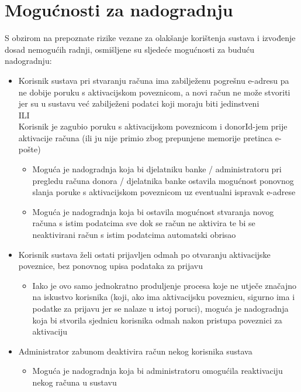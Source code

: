         \section{Mogućnosti za nadogradnju}
            \par{
            S obzirom na prepoznate rizike vezane za olakšanje korištenja sustava i izvođenje dosad nemogućih radnji, osmišljene su sljedeće mogućnosti za buduću nadogradnju:
            \begin{itemize}
            
                 \item Korisnik sustava pri stvaranju računa ima zabilježenu pogrešnu e-adresu pa ne dobije poruku s aktivacijskom poveznicom, a novi račun ne može stvoriti jer su u sustavu već zabilježeni podatci koji moraju biti jedinstveni 
                 \\ ILI
                \\ Korisnik je zagubio poruku s aktivacijskom poveznicom i donorId-jem prije aktivacije računa (ili ju nije primio zbog prepunjene memorije pretinca e-pošte)
                \begin{itemize}
                    \item Moguća je nadogradnja koja  bi djelatniku banke / administratoru pri pregledu računa donora / djelatnika banke ostavila mogućnost ponovnog slanja poruke s aktivacijskom poveznicom uz eventualni ispravak e-adrese
                    \item Moguća je nadogradnja koja bi ostavila mogućnost stvaranja novog računa s istim podatcima sve dok se račun ne aktivira te bi se neaktivirani račun s istim podatcima automatski obrisao
                \end{itemize}
                
                 \item Korisnik sustava želi ostati prijavljen odmah po otvaranju aktivacijske poveznice, bez ponovnog upisa podataka za prijavu
                \begin{itemize}
                    \item Iako je ovo samo jednokratno produljenje procesa koje ne utječe značajno na iskustvo korisnika (koji, ako ima aktivacijsku poveznicu, sigurno ima i podatke za prijavu jer se nalaze u istoj poruci), moguća je nadogradnja koja bi stvorila sjednicu korisnika odmah nakon pristupa poveznici za aktivaciju
                \end{itemize}
                
                 \item Administrator zabunom deaktivira račun nekog korisnika sustava
                \begin{itemize}
                    \item Moguća je nadogradnja koja bi administratoru omogućila reaktivaciju nekog računa u sustavu
                \end{itemize}
                

\end{itemize}}
